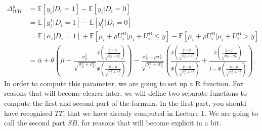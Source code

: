 \documentclass[]{book}
\newcommand{\esp}[1]{\mathbb{E}[ #1 ]}
\theoremstyle{definition}
\theoremstyle{definition}
\theoremstyle{definition}
\theoremstyle{remark}
\begin{document}
\begin{align*}
\Delta^y_{WW} & = \esp{y_i|D_i=1}-\esp{y_i|D_i=0} \\
              & = \esp{y_i^1|D_i=1}-\esp{y^0_i|D_i=0} \\
              & = \esp{\alpha_i|D_i=1}+\esp{\mu_i+\rho U_i^B|\mu_i+U_i^B\leq\bar{y}}-\esp{\mu_i+\rho U_i^B|\mu_i+U_i^B>\bar{y}} \\
              & = \bar{\alpha}+\theta\left(\bar{\mu}-\frac{\sigma^2_{\mu}}{\sqrt{\sigma^2_{\mu}+\sigma^2_{U}}}\frac{\phi\left(\frac{\bar{y}-\bar{\mu}}{\sqrt{\sigma^2_{\mu}+\sigma^2_{U}}}\right)}{\Phi\left(\frac{\bar{y}-\bar{\mu}}{\sqrt{\sigma^2_{\mu}+\sigma^2_{U}}}\right)}\right)  
              -\frac{\sigma^2_{\mu}+\rho\sigma^2_{U}}{\sqrt{\sigma^2_{\mu}+\sigma^2_{U}}}\left(\frac{\phi\left(\frac{\bar{y}-\bar{\mu}}{\sqrt{\sigma^2_{\mu}+\sigma^2_{U}}}\right)}{\Phi\left(\frac{\bar{y}-\bar{\mu}}{\sqrt{\sigma^2_{\mu}+\sigma^2_{U}}}\right)}+\frac{\phi\left(\frac{\bar{y}-\bar{\mu}}{\sqrt{\sigma^2_{\mu}+\sigma^2_{U}}}\right)}{1-\Phi\left(\frac{\bar{y}-\bar{\mu}}{\sqrt{\sigma^2_{\mu}+\sigma^2_{U}}}\right)}\right).
\end{align*}
 In order to compute this parameter, we are going
to set up a R function. For reasons that will become clearer later, we
will define two separate functions to compute the first and second part
of the formula. In the first part, you should have recognised \(TT\),
that we have already computed in Lecture 1. We are going to call the
second part \(SB\), for reasons that will become explicit in a bit.
\end{document}
